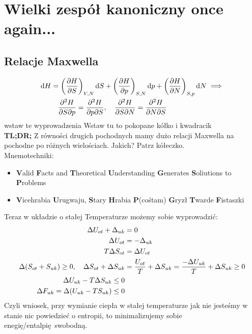 \documentclass[12pt,a4paper]{report}
\newcommand{\com}[1]{{\color{red} #1}}
\renewcommand{\emph}{\textbf}
\newenvironment{lecture}[1]{\par\medskip
   \noindent\chapter{#1} \rmfamily}{\medskip}
\begin{document}
\begin{lecture}{Wielki zespół kanoniczny once again...}
\section{Relacje Maxwella}
\begin{align*}
\dd{H} = \qty(\pdv{H}{S})_{V,N} \dd{S} &+ \qty(\pdv{H}{p})_{S, N} \dd{p} + \qty(\pdv{H}{N})_{S,p} \dd{N} \implies\\
\pdv{H}{S}{p} = \pdv{H}{p}{S} &\qc \pdv{H}{S}{N} = \pdv{H}{N}{S}\\
\end{align*}
\com{wstaw te wyprowadzenia}
\com{Wstaw tu to pokopane kółko i kwadracik}\\
\emph{TL;DR;} Z równości drugich pochodnych mamy dużo relacji Maxwella na pochodne po różnych wielościach. Jakich? Patrz kółeczko.\\
Mnemotechniki:
\begin{itemize}
    \item \emph{V}alid \emph{F}acts and \emph{T}heoretical \emph{U}nderstanding \emph{G}enerates \emph{S}oliutions to \emph{P}roblems
    \item \emph{V}icehrabia \emph{U}rugwaju, \emph{S}tary \emph{H}rabia \emph{P}(cośtam) \emph{G}ryzł \emph{T}warde \emph{F}istaszki
\end{itemize}

Teraz w układzie o stałej Temperaturze możemy sobie wyprowadzić:
\begin{align*}
    \Delta U_{ot} + \Delta _{uk} &= 0\\
    \Delta U_{ot} &= - \Delta _{uk}\\
    T \Delta S_{ot} &= \Delta U_{ot}\\
    \Delta (S_{ot} + S_{uk}) \geq 0 \qc \Delta S_{ot} + \Delta S_{uk} &= \frac{U_{ot}}{T} + \Delta S_{uk} = \frac{-\Delta U_{uk}}{T} + \Delta S_{uk} \geq 0 \\
    \Delta U_{uk} - T \Delta S_{uk} \leq 0\\
    \Delta F_{uk} = \Delta(U_{uk} - T S_{uk}) \leq 0
\end{align*}
Czyli wniosek, przy wymianie ciepła w stałej temperaturze jak nie jesteśmy w stanie nic powiedzieć o entropii, to minimalizujemy sobie enegię/entalpię swobodną.
\end{lecture}


\tableofcontents

\listoffigures

\printindex

\end{document}

